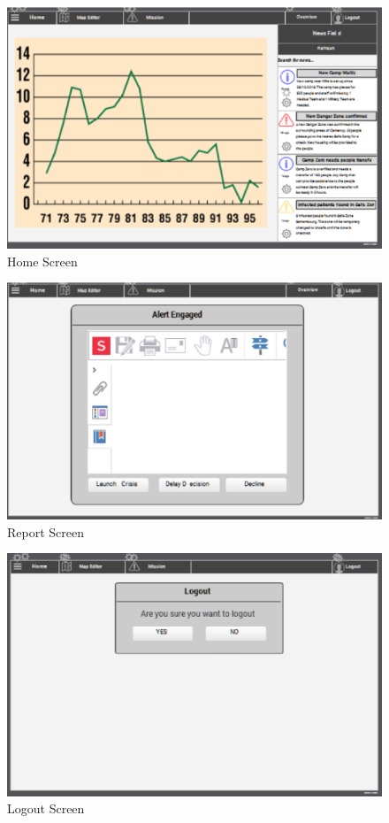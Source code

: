 \begin{figure}[htbp]
\begin{center}
 \caption{\label{fig:W2} Home Screen}
   \includegraphics[width=150mm]{./images/Web/chomescreen.eps}
\end{center}
\end{figure}
\begin{figure}[htbp]
\begin{center}
 \caption{\label{fig:W4} Report Screen}
   \includegraphics[width=150mm]{./images/Web/calertengaged.eps}
\end{center}
\end{figure}
\begin{figure}[htbp]
\begin{center}
 \caption{\label{fig:W5} Logout Screen}
   \includegraphics[width=150mm]{./images/Web/logout.eps}
\end{center}
\end{figure}
